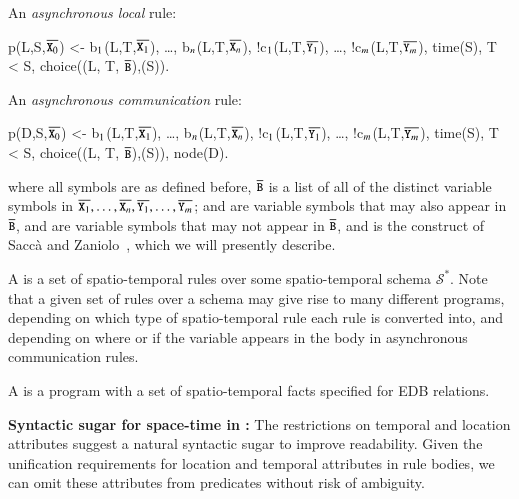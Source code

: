 An {\em asynchronous local} rule:

\begin{Dedalus}
p(L,S,\(\overline{\dedalus{X}\sb{0}}\)) <- b\(\sb{1}\)(L,T,\(\overline{\dedalus{X}\sb{1}}\)), \ldots, b\(\sb{n}\)(L,T,\(\overline{\dedalus{X}\sb{n}}\)),
!c\(\sb{1}\)(L,T,\(\overline{\dedalus{Y}\sb{1}}\)), \ldots, !c\(\sb{m}\)(L,T,\(\overline{\dedalus{Y}\sb{m}}\)), time(S),
T < S, choice((L, T, \(\overline{\dedalus{B}}\)),(S)).
\end{Dedalus}

An {\em asynchronous communication} rule:

\begin{Dedalus}
p(D,S,\(\overline{\dedalus{X}\sb{0}}\)) <- b\(\sb{1}\)(L,T,\(\overline{\dedalus{X}\sb{1}}\)), \ldots, b\(\sb{n}\)(L,T,\(\overline{\dedalus{X}\sb{n}}\)),
!c\(\sb{1}\)(L,T,\(\overline{\dedalus{Y}\sb{1}}\)), \ldots, !c\(\sb{m}\)(L,T,\(\overline{\dedalus{Y}\sb{m}}\)), time(S),
T < S, choice((L, T, \(\overline{\dedalus{B}}\)),(S)), node(D).
\end{Dedalus}

where all symbols are as defined before, $\overline{\dedalus{B}}$ is a list of all of the distinct variable symbols in $\overline{\dedalus{X}_1}, \ldots, \overline{\dedalus{X}_n}, \overline{\dedalus{Y}_1}, \ldots, \overline{\dedalus{Y}_m}$;  and  are variable symbols that may also appear in $\overline{\dedalus{B}}$,  and  are variable symbols that may not appear in $\overline{\dedalus{B}}$, and  is the construct of Sacc\`{a} and Zaniolo~\cite{sacca-zaniolo}, which we will presently describe.

A  is a set of spatio-temporal rules over some spatio-temporal schema $\mathcal{S}^*$.  Note that a given set of rules over a schema may give rise to many different \lang programs, depending on which type of spatio-temporal rule each rule is converted into, and depending on where or if the variable  appears in the body in asynchronous communication rules.

A  is a program with a set of spatio-temporal facts specified for EDB relations.

\noindent
\textbf{Syntactic sugar for space-time in \lang:}
The restrictions on temporal and location attributes suggest a natural syntactic sugar to improve readability.  Given the unification requirements for location and temporal attributes in rule bodies, we can omit these attributes from predicates without risk of ambiguity.  


